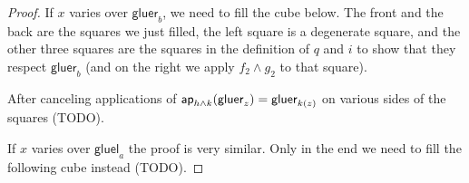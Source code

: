 \documentclass{article}
\renewcommand{\smash}{\wedge}
\newcommand{\tr}{\cdot}
\newcommand{\auxr}{\mathsf{auxr}}
\newcommand{\gluel}{\mathsf{gluel}}
\newcommand{\gluer}{\mathsf{gluer}}
\newcommand{\sy}{^{-1}}
\begin{document}
\begin{proof}
  If $x$ varies over $\gluer_b$, we need to fill the cube below. The front and the back are the
  squares we just filled, the left square is a degenerate square, and the other three squares are
  the squares in the definition of $q$ and $i$ to show that they respect $\gluer_b$ (and on the
  right we apply $f_2\smash g_2$ to that square).
  \begin{center}
  \end{center}
  After canceling applications of
  $\mapfunc{h\smash k}(\gluer_z)=\gluer_{k(z)}$ on various sides of the squares (TODO).

  
  If $x$ varies over $\gluel_a$ the proof is very similar. Only in the end we need to fill the
  following cube instead (TODO).

\end{proof}
\end{document}
